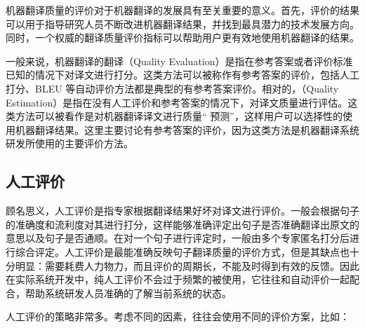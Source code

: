 \parinterval 机器翻译质量的评价对于机器翻译的发展具有至关重要的意义。首先，评价的结果可以用于指导研究人员不断改进机器翻译结果，并找到最具潜力的技术发展方向。同时，一个权威的翻译质量评价指标可以帮助用户更有效地使用机器翻译的结果。

\parinterval 一般来说，机器翻译的翻译{\small{}}（Quality Evaluation）是指在参考答案或者评价标准已知的情况下对译文进行打分。这类方法可以被称作有参考答案的评价，包括人工打分、BLEU 等自动评价方法都是典型的有参考答案评价。相对的，{\small{}}（Quality Estimation）是指在没有人工评价和参考答案的情况下，对译文质量进行评估。这类方法可以被看作是对机器翻译译文进行质量`` 预测''，这样用户可以选择性的使用机器翻译结果。这里主要讨论有参考答案的评价，因为这类方法是机器翻译系统研发所使用的主要评价方法。


\subsection{人工评价}

\parinterval 顾名思义，人工评价是指专家根据翻译结果好坏对译文进行评价。一般会根据句子的准确度和流利度对其进行打分，这样能够准确评定出句子是否准确翻译出原文的意思以及句子是否通顺。在对一个句子进行评定时，一般由多个专家匿名打分后进行综合评定。人工评价是最能准确反映句子翻译质量的评价方式，但是其缺点也十分明显：需要耗费人力物力，而且评价的周期长，不能及时得到有效的反馈。因此在实际系统开发中，纯人工评价不会过于频繁的被使用，它往往和自动评价一起配合，帮助系统研发人员准确的了解当前系统的状态。

\parinterval 人工评价的策略非常多。考虑不同的因素，往往会使用不同的评价方案，比如：

